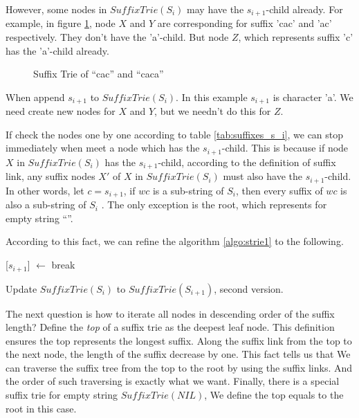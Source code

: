 \documentclass{article}
\begin{document}
However, some nodes in $SuffixTrie(S_i)$ may have the $s_{i+1}$-child already.
For example, in figure \ref{fig:strie-cac}, node $X$ and $Y$ are corresponding
for suffix 'cac' and 'ac' respectively. They don't have the 'a'-child.
But node $Z$, which represents suffix 'c' has the 'a'-child already.

\begin{figure}[htbp]
  \centering
  \caption{Suffix Trie of ``cac'' and ``caca''}
  \label{fig:strie-cac}
\end{figure}

When append $s_{i+1}$ to $SuffixTrie(S_i)$. In this example $s_{i+1}$ is character 'a'.
We need create new nodes for $X$ and $Y$, but we needn't do this
for $Z$.

If check the nodes one by one according to table \ref{tab:suffixes_s_i}, we can
stop immediately when meet a node which has the $s_{i+1}$-child. This is because
if node $X$ in $SuffixTrie(S_i)$ has the $s_{i+1}$-child, according to the
definition of suffix link, any suffix nodes $X'$ of $X$ in $SuffixTrie(S_i)$ must
also have the $s_{i+1}$-child. In other words, let $c=s_{i+1}$, if $wc$ is a sub-string
of $S_i$, then every suffix of $wc$ is also a sub-string of $S_i$ \cite{ukkonen95}.
The only exception is the root, which represents for empty string ``''.

According to this fact, we can refine the algorithm \ref{algo:strie1} to
the following.

\begin{algorithm}
  \begin{algorithmic}[1]
      \State {}[$s_{i+1}$] $\gets$ 
    \Else
      \State break
    \EndIf
  \EndFor
  \end{algorithmic}
  \caption{Update $SuffixTrie(S_i)$ to $SuffixTrie(S_{i+1})$, second version.}
  \label{algo:strie2}
\end{algorithm}

The next question is how to iterate all nodes
in descending order of the suffix length? Define the {\em top} of a suffix
trie as the deepest leaf node. This definition ensures the top represents
the longest suffix. Along the suffix link from the top to the next node,
the length of the suffix decrease by one. This fact tells us that
We can traverse the suffix tree from the top
to the root by using the suffix links. And the order of such traversing
is exactly what we want.
Finally, there is a special suffix trie for empty string $SuffixTrie(NIL)$,
We define the top equals to the root in this case.
\end{document}

